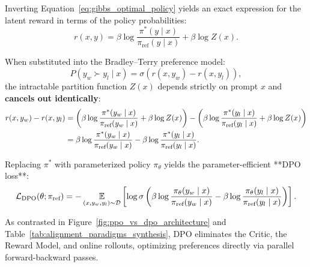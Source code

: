 \documentclass[../../main.tex]{subfiles}
\begin{document}
Inverting Equation~\eqref{eq:gibbs_optimal_policy} yields an exact expression for the latent reward in terms of the policy probabilities:
\begin{equation}
\label{eq:inverted_reward_dpo}
r(x, y) = \beta \log \frac{\pi^*(y \mid x)}{\pi_{\text{ref}}(y \mid x)} + \beta \log Z(x).
\end{equation}

When substituted into the Bradley--Terry preference model:
\begin{equation}
P(y_w \succ y_l \mid x) = \sigma\left(r(x, y_w) - r(x, y_l)\right),
\end{equation}
the intractable partition function $Z(x)$ depends strictly on prompt $x$ and \textbf{cancels out identically}:
\begin{align}
r(x, y_w) - r(x, y_l) &= \left( \beta \log \frac{\pi^*(y_w \mid x)}{\pi_{\text{ref}}(y_w \mid x)} + \beta \log Z(x) \right) - \left( \beta \log \frac{\pi^*(y_l \mid x)}{\pi_{\text{ref}}(y_l \mid x)} + \beta \log Z(x) \right) \notag \\
&= \beta \log \frac{\pi^*(y_w \mid x)}{\pi_{\text{ref}}(y_w \mid x)} - \beta \log \frac{\pi^*(y_l \mid x)}{\pi_{\text{ref}}(y_l \mid x)}.
\end{align}

Replacing $\pi^*$ with parameterized policy $\pi_\theta$ yields the parameter-efficient **DPO loss**:
\begin{equation}
\label{eq:dpo_closed_loss}
\mathcal{L}_{\text{DPO}}(\theta; \pi_{\text{ref}}) = -\operatorname*{\mathbb{E}}_{(x, y_w, y_l) \sim \mathcal{D}} \left[ \log \sigma\left( \beta \log \frac{\pi_\theta(y_w \mid x)}{\pi_{\text{ref}}(y_w \mid x)} - \beta \log \frac{\pi_\theta(y_l \mid x)}{\pi_{\text{ref}}(y_l \mid x)} \right) \right].
\end{equation}

As contrasted in Figure~\ref{fig:ppo_vs_dpo_architecture} and Table~\ref{tab:alignment_paradigms_synthesis}, DPO eliminates the Critic, the Reward Model, and online rollouts, optimizing preferences directly via parallel forward-backward passes.
\end{document}
